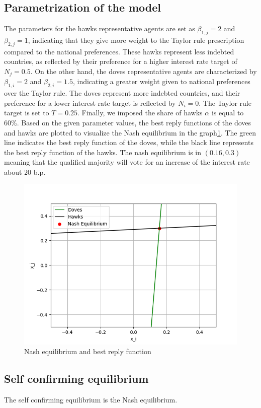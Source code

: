 \documentclass[12pt]{article}
\begin{document}
\subsection{Parametrization of the model}
The parameters for the hawks representative agents are set as $\beta_{1,j} = 2$ and $\beta_{2,j} = 1$, indicating that
they give more weight to the Taylor rule prescription compared to the national preferences. These hawks represent less
indebted countries, as reflected by their preference for a higher interest rate target of $N_{j} = 0.5$. On the other
hand, the doves representative agents are characterized by $\beta_{1,i} = 2$ and $\beta_{2,i} = 1.5$, indicating a
greater weight given to national preferences over the Taylor rule. The doves represent more indebted countries, and
their preference for a lower interest rate target is reflected by $N_{i} = 0$. The Taylor rule target is set to $T =
0.25$. Finally, we imposed the share of hawks $\alpha$ is equal to $60\%$. 
Based on the given parameter values, the best
reply functions of the doves and hawks are plotted to visualize the Nash equilibrium in  the graph\ref{figure1}. 
The green line indicates the best 
reply function of the doves, while the black line represents the best reply function of the hawks.
The nash equilibrium is in $(0.16,0.3)$ meaning that the qualified majority will vote for an increase of the interest
rate  about 20 b.p.
\begin{figure}
    \centering
    \includegraphics[scale=0.8]{plot.png}
    \caption{Nash equilibrium and best reply function\label{figure1}}
\end{figure}
\subsection{Self confirming equilibrium}
The self confirming equilibrium is the Nash equilibrium.
\end{document}
